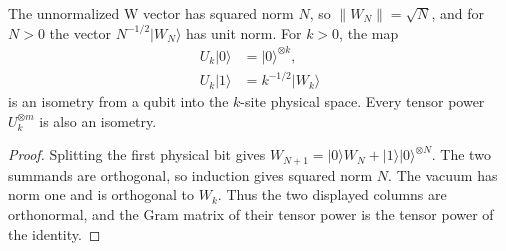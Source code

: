 \begin{lemma}
    \label{lem:w_state_block_encoding}
    \leanok
    The unnormalized W vector has squared norm $N$, so $\|W_N\|=\sqrt N$, and
    for $N>0$ the vector $N^{-1/2}|W_N\rangle$ has unit norm. For $k>0$, the map
    \begin{align}
        U_k|0\rangle & =|0\rangle^{\otimes k}, \\
        U_k|1\rangle & =k^{-1/2}|W_k\rangle
        \label{eq:w_state_block_encoding}
    \end{align}
    is an isometry from a qubit into the $k$-site physical space.
    Every tensor power $U_k^{\otimes m}$ is also an isometry.
\end{lemma}
\begin{proof}
    \leanok
    Splitting the first physical bit gives
    $W_{N+1}=|0\rangle W_N+|1\rangle|0\rangle^{\otimes N}$.
    The two summands are orthogonal, so induction gives squared norm $N$.
    The vacuum has norm one and is orthogonal to $W_k$. Thus the two
    displayed columns are orthonormal, and the Gram matrix of their tensor
    power is the tensor power of the identity.
\end{proof}

